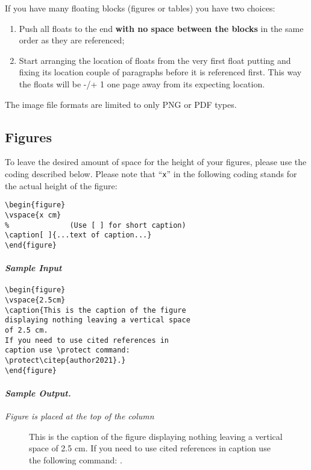 \documentclass[usenatbib]{tjaa}
\begin{document}
If you have many floating blocks (figures or tables) you have two choices:
\begin{enumerate}
\item
Push all floats to the end \textbf{with no space between the blocks} in the
same order as they are referenced;
\item
Start arranging the location of floats from the very first float putting and
fixing its location couple of paragraphs before it is referenced first. This
way the floats will be -/+ 1 one page away from its expecting location.
\end{enumerate}
The image file formats are limited to only PNG or PDF types.

\subsection{Figures}

To leave the desired amount of space for the height of your figures, please
use the coding described below.
Please note that ``\verb|x|'' in the following coding stands for the actual
height of the figure:
\begin{verbatim}
\begin{figure}
\vspace{x cm}
%              (Use [ ] for short caption)
\caption[ ]{...text of caption...}
\end{figure}
\end{verbatim}
\paragraph*{\itshape Sample Input}
\begin{verbatim}
\begin{figure}
\vspace{2.5cm}
\caption{This is the caption of the figure
displaying nothing leaving a vertical space
of 2.5 cm.
If you need to use cited references in
caption use \protect command:
\protect\citep{author2021}.}
\end{figure}
\end{verbatim}
\paragraph*{\itshape Sample Output.}{\itshape Figure is placed at the top of the column} 
\begin{figure}
\vspace{2.5cm}
\caption{%
This is the caption of the figure displaying nothing leaving a vertical space
of 2.5 cm. If you need to use cited references in caption use the following
command: \usebox{\verbbox}.}
\end{figure}
\end{document}
